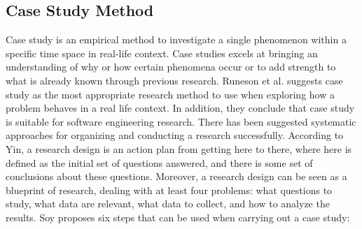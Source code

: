 \subsection{Case Study Method}
\label{subsec:casestudymethod}
Case study is an empirical method to investigate a single phenomenon within a specific time space in real-life context\cite{Wohlin:2000:ESE:330775}. Case studies excels at bringing an understanding of why or how certain phenomena occur or to add strength to what is already known through previous research\cite{Wohlin:2000:ESE:330775,soysusan}. Runeson et al.\cite{Runeson:2009:GCR:1519313.1519324} suggests case study as the most appropriate research method to use when exploring how a problem behaves in a real life context. In addition, they conclude that case study is suitable for software engineering research. There has been suggested systematic approaches for organizing and conducting a research successfully\cite{soysusan,Runeson:2009:GCR:1519313.1519324}. According to Yin\cite{yin2003case}, a research design is an action plan from getting here to there, where here is defined as the initial set of questions answered, and there is some set of conclusions about these questions. Moreover, a research design can be seen as a blueprint of research, dealing with at least four problems: what questions to study, what data are relevant, what data to collect, and how to analyze the results\cite{yin2003case}. Soy\cite{soysusan} proposes six steps that can be used when carrying out a case study:

